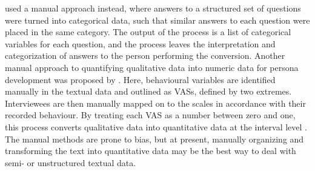 
\cite{Laporte2012} used a manual approach instead, where answers to a structured set of questions were turned into categorical data, such that similar answers to each question were placed in the same category. The output of the process is a list of categorical variables for each question, and the process leaves the interpretation and categorization of answers to the person performing the conversion. Another manual approach to quantifying qualitative data into numeric data for persona development was proposed by \cite{Goodwin2002}. Here, behavioural variables are identified manually in the textual data and outlined as VASs, defined by two extremes. Interviewees are then manually mapped on to the scales in accordance with their recorded behaviour. By treating each VAS as a number between zero and one, this process converts qualitative data into quantitative data at the interval level \citep{Stevens1946}. The manual methods are prone to bias, but at present, manually organizing and transforming the text into quantitative data may be the best way to deal with semi- or unstructured textual data.

